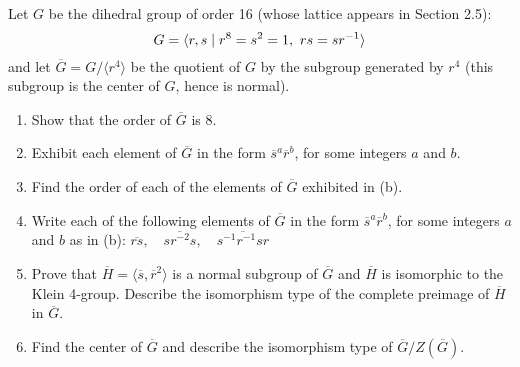 \begin{exercise}
    Let $G$ be the dihedral group of order 16 (whose lattice appears in Section 2.5):
    $$G = \langle r,s \dvd r^8 = s^2 = 1, \ rs = sr^{-1}\rangle$$
    and let $\overline{G} = G / \langle r^4 \rangle$ be the quotient of $G$ by the subgroup generated by $r^4$ (this subgroup is the center of $G$, hence is normal).
    \begin{enumerate}[label = \textbf{(\alph*)}]
        \item Show that the order of $\overline{G}$ is 8. 
        \item Exhibit each element of $\overline{G}$ in the form $\overline{s}^a\overline{r}^b$, for some integers $a$ and $b$.
        \item Find the order of each of the elements of $\overline{G}$ exhibited in (b).
        \item Write each of the following elements of $\overline{G}$ in the form $\overline{s}^a\overline{r}^b$, for some integers $a$ and $b$ as in (b): $\overline{rs}, \quad \overline{sr^{-2}s}, \quad \overline{s^{-1}r^{-1}sr}$
        \item Prove that $\overline{H} = \langle \overline{s}, \overline{r}^2 \rangle$ is a normal subgroup of $\overline{G}$ and $\overline{H}$ is isomorphic to the Klein 4-group. Describe the isomorphism type of the complete preimage of $\overline{H}$ in $\overline{G}$.
        \item Find the center of $\overline{G}$ and describe the isomorphism type of $\overline{G}/Z(\overline{G})$. \\
    \end{enumerate}
\end{exercise}

